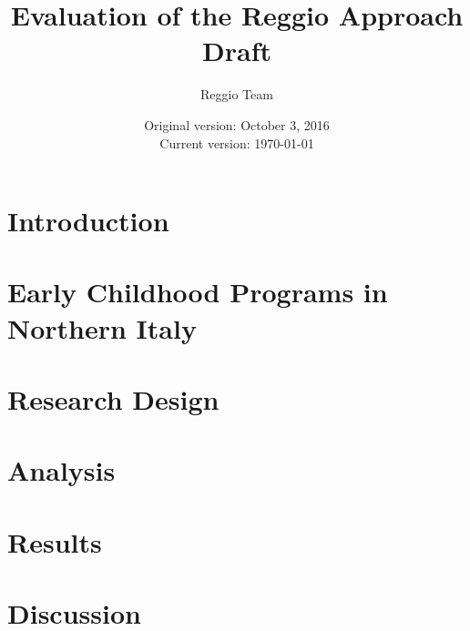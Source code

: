 






\title{\Large \textbf{Evaluation of the Reggio Approach} \\ Draft}
\author{\normalsize Reggio Team}
\date{\normalsize Original version: October 3, 2016 \\ Current version: \today}
\maketitle

\tableofcontents

\clearpage
\doublespacing

\section{Introduction}\label{sec:introduction}


\section{Early Childhood Programs in Northern Italy}\label{sec:ece-italy}


\section{Research Design}\label{sec:data}




\section{Analysis}\label{sec:methodology}
%


\section{Results}\label{sec:result}

\clearpage

\section{Discussion}\label{sec:discussion}


\clearpage






